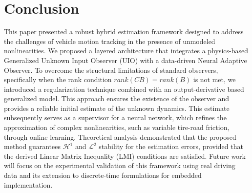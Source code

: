 \documentclass{ifacconf}
\begin{document}































\vspace*{-0.2cm}
\section{Conclusion}\label{sec7}
\vspace*{-0.2cm}
%
This paper presented a robust hybrid estimation framework designed to address the challenges of vehicle motion tracking in the presence of unmodeled nonlinearities. We proposed a layered architecture that integrates a physics-based Generalized Unknown Input Observer (UIO) with a data-driven Neural Adaptive Observer. To overcome the structural limitations of standard observers, specifically when the rank condition $rank(CB) = rank(B)$ is not met, we introduced a regularization technique combined with an output-derivative based generalized model. This approach ensures the existence of the observer and provides a reliable initial estimate of the unknown dynamics. This estimate subsequently serves as a supervisor for a neural network, which refines the approximation of complex nonlinearities, such as variable tire-road friction, through online learning. Theoretical analysis demonstrated that the proposed method guarantees $\mathcal{H}^1$ and $\mathcal{L}^2$ stability for the estimation errors, provided that the derived Linear Matrix Inequality (LMI) conditions are satisfied. Future work will focus on the experimental validation of this framework using real driving data and its extension to discrete-time formulations for embedded implementation.

\vspace*{-0.2cm}
% 
% 

\end{document}
